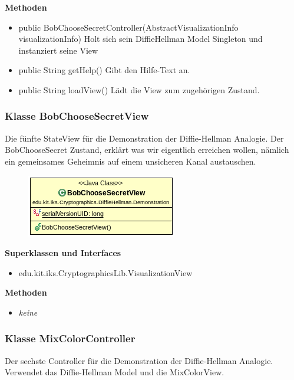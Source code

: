 \documentclass{article}
\begin{document}
      \textbf{Methoden}
      \begin{itemize}
          \item public BobChooseSecretController(AbstractVisualizationInfo visualizationInfo) \newline
              Holt sich sein DiffieHellman Model Singleton und instanziert seine View
        \item public String getHelp() \newline
        Gibt den Hilfe-Text an.
        \item public String loadView() \newline
        Lädt die View zum zugehörigen Zustand.
      \end{itemize}

\subsubsection{Klasse BobChooseSecretView}
      Die fünfte StateView für die Demonstration der Diffie-Hellman Analogie.
      Der BobChooseSecret Zustand, erklärt was wir eigentlich erreichen wollen,
      nämlich ein gemeinsames Geheimnis auf einem unsicheren Kanal austauschen.

      \begin{figure}[H]
        \centering
        \includegraphics{resources/edu-kit-iks-Cryptographics-DiffieHellman-Demonstration-BobChooseSecretView}
      \end{figure}

      \textbf{Superklassen und Interfaces}
      \begin{itemize}
        \item edu.kit.iks.CryptographicsLib.VisualizationView
      \end{itemize}

      \textbf{Methoden}
      \begin{itemize}
        \item \textit{keine}
      \end{itemize}

\subsubsection{Klasse MixColorController}
      Der sechste Controller für die Demonstration der Diffie-Hellman Analogie.
      Verwendet das Diffie-Hellman Model und die MixColorView.
\end{document}
